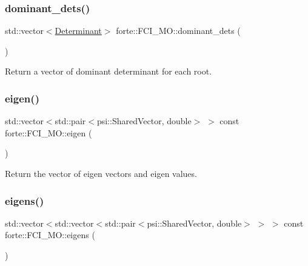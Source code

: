 \mbox{\label{classforte_1_1_f_c_i___m_o_a997478ffd6afbf77f26b1a02679fb851}} 
\subsubsection{\texorpdfstring{dominant\+\_\+dets()}{dominant\_dets()}}
{\footnotesize\ttfamily std\+::vector$<$\mbox{\hyperlink{namespaceforte_a2076c63fd7b8732004d9e1442ce527c1}{Determinant}}$>$ forte\+::\+F\+C\+I\+\_\+\+M\+O\+::dominant\+\_\+dets (\begin{DoxyParamCaption}{ }\end{DoxyParamCaption})\hspace{0.3cm}{\ttfamily [inline]}}



Return a vector of dominant determinant for each root. 

\mbox{\label{classforte_1_1_f_c_i___m_o_a7c37f298fb6cbe8870b75d5fa3faa7c9}} 
\subsubsection{\texorpdfstring{eigen()}{eigen()}}
{\footnotesize\ttfamily std\+::vector$<$std\+::pair$<$psi\+::\+Shared\+Vector, double$>$ $>$ const forte\+::\+F\+C\+I\+\_\+\+M\+O\+::eigen (\begin{DoxyParamCaption}{ }\end{DoxyParamCaption})\hspace{0.3cm}{\ttfamily [inline]}}



Return the vector of eigen vectors and eigen values. 

\mbox{\label{classforte_1_1_f_c_i___m_o_a604127ddded2873abc01f2a8e42e319a}} 
\subsubsection{\texorpdfstring{eigens()}{eigens()}}
{\footnotesize\ttfamily std\+::vector$<$std\+::vector$<$std\+::pair$<$psi\+::\+Shared\+Vector, double$>$ $>$ $>$ const forte\+::\+F\+C\+I\+\_\+\+M\+O\+::eigens (\begin{DoxyParamCaption}{ }\end{DoxyParamCaption})\hspace{0.3cm}{\ttfamily [inline]}}



